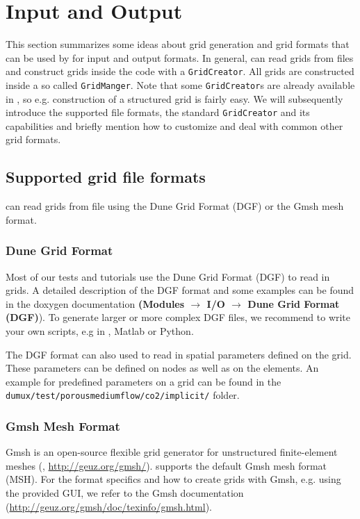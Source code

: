 \section{Input and Output}
\label{sec:inputandoutput}

This section summarizes some ideas about grid generation and grid formats that can be used by \Dumux
for input and output formats.
In general,
\Dumux can read grids from files and construct grids inside the code with a \texttt{GridCreator}.
All grids are constructed inside a so called \texttt{GridManger}.  
Note that some \texttt{GridCreator}s are already available in \Dumux, so e.g.
construction of a structured grid is fairly easy. We will subsequently introduce the supported file formats,
the standard \texttt{GridCreator} and its capabilities
and briefly mention how to customize and deal with common other grid formats.

\subsection{Supported grid file formats}
\Dumux can read grids from file using the Dune Grid Format (DGF) or the Gmsh mesh format.

\subsubsection{Dune Grid Format}
Most of our \Dumux tests and tutorials use the Dune Grid Format (DGF) to read in grids. A detailed description
of the DGF format and some examples can be found in the \Dune doxygen documentation
\textbf{(Modules $\rightarrow$ I/O $\rightarrow$ Dune Grid Format (DGF)}). To generate larger or more
complex DGF files, we recommend to write your own scripts, e.g in \Cplusplus, Matlab or Python.

The DGF format can also used to read in spatial parameters defined on the grid. These parameters can
be defined on nodes as well as on the elements. An example for predefined parameters on a grid
can be found in the  \texttt{dumux/test/porousmediumflow/co2/implicit/} folder.

\subsubsection{Gmsh Mesh Format}
Gmsh is an open-source flexible grid generator for unstructured finite-element meshes (\cite{GEUZAINE2009}, \url{http://geuz.org/gmsh/}).
\Dumux supports the default Gmsh mesh format (MSH). For the format specifics and how to create grids with Gmsh, e.g. using
the provided GUI, we refer to the Gmsh documentation (\url{http://geuz.org/gmsh/doc/texinfo/gmsh.html}).


